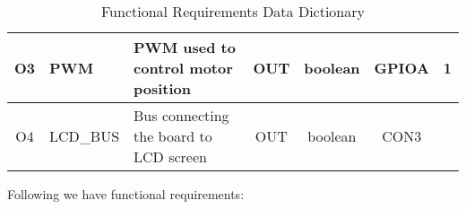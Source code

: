 \begin{table}[t]
{\begin{tabular}{c|l|l|c|c|c|c}
O3          & PWM                                & PWM used to control motor position                                                                                               & OUT                & boolean           & GPIOA         & 1            \\ \hline
O4          & LCD\_BUS                           & Bus connecting the board to LCD screen                                                                                           & OUT                & boolean           & CON3           &             
\end{tabular}%
}
\caption{Functional Requirements Data Dictionary}
\label{tab:func_data_dictionary}
\end{table}

Following we have functional requirements:


